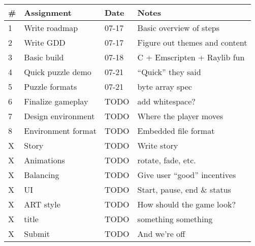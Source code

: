\documentclass[12pt, letterpaper]{article}
\begin{document}
\bgroup
\def\arraystretch{1.5}
\begin{tabular}{ R{0.4cm} p{4cm} p{1.5cm} p{5.5cm} }
\toprule
{} & \textbf{Assignment} & \textbf{Date} & \textbf{Notes} \\ 
 & Write roadmap & 07-17 & Basic overview of steps \\
2 & Write GDD & 07-17 & Figure out themes and content \\
3 & Basic build & 07-18 & C + Emscripten + Raylib fun \\
4 & Quick puzzle demo & 07-21 & ``Quick'' they said \\
5 & Puzzle formats & 07-21 & byte array spec \\
6 & Finalize gameplay & TODO & add whitespace? \\

7 & Design environment & TODO & Where the player moves \\
8 & Environment format & TODO & Embedded file format \\

X & Story & TODO & Write story \\
X & Animations & TODO & rotate, fade, etc. \\
X & Balancing & TODO & Give user ``good'' incentives \\
X & UI & TODO & Start, pause, end \& status \\
X & ART style & TODO & How should the game look? \\
X & title & TODO & something something \\
X & Submit & TODO & And we're off \\

\bottomrule
\end{tabular}
\egroup
\end{document}

